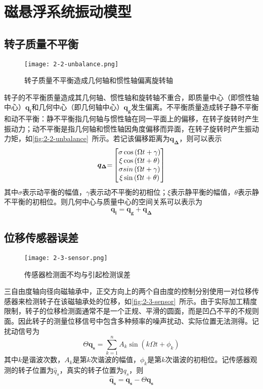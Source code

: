 \documentclass[
  lang=cn,
  degree=master,
  openany,oneside
]{nuaathesis}
\begin{document}
\section{磁悬浮系统振动模型}
\subsection{转子质量不平衡}
\begin{figure}[h!]
	\texttt{[image: 2-2-unbalance.png]}
	\caption{转子质量不平衡造成几何轴和惯性轴偏离旋转轴}
	\label{fig:2-2-unbalance}
\end{figure}

转子的不平衡质量造成其几何轴、惯性轴和旋转轴不重合，即质量中心（即惯性轴中心）$ \boldsymbol{q_i} $和几何中心（即几何轴中心）$ \boldsymbol{q_g} $发生偏离。不平衡质量造成转子静不平衡和动不平衡：静不平衡指几何轴与惯性轴在同一平面上的偏移，在转子旋转时产生振动力；动不平衡是指几何轴和惯性轴因角度偏移而异面，在转子旋转时产生振动力矩，如\autoref{fig:2-2-unbalance}~所示。若记该偏移距离为$ \boldsymbol{q_{\Delta}} $，则可以表示
\begin{equation}
\label{eq:q_delta}
\boldsymbol{{q}_\Delta }{ = }\left[ 
{\begin{matrix}
   {\sigma \cos \left( {\Omega t + \gamma } \right)}  \cr 
   {\xi \cos \left( {\Omega t + \theta } \right)}  \cr 
   {\sigma sin\left( {\Omega t + \gamma } \right)}  \cr 
   {\xi \sin \left( {\Omega t + \theta } \right)}  \cr 
\end{matrix}} 
 \right]
\end{equation}
其中$\sigma$表示动平衡的幅值，$\gamma$表示动不平衡的初相位；$\xi$表示静平衡的幅值，$\theta$表示静不平衡的初相位。则几何中心与质量中心的空间关系可以表示为
\begin{equation}
\boldsymbol{{q}_i}{ = }\boldsymbol{{q}_{g}} + \boldsymbol{{q}_\Delta }
\end{equation}

\subsection{位移传感器误差}

\begin{figure}[h!]
	\texttt{[image: 2-3-sensor.png]}
	\caption{传感器检测面不均与引起检测误差}
	\label{fig:2-3-sensor}
\end{figure}

三自由度轴向径向磁轴承中，正交方向上的两个自由度的控制分别使用一对位移传感器来检测转子在该磁轴承处的位移，如\autoref{fig:2-3-sensor}~所示。由于实际加工精度限制，转子的位移检测面通常不是一个正规、平滑的圆面，而是凹凸不平的不规则面。因此转子的测量位移信号中包含多种频率的噪声扰动、实际位置无法测得。记扰动信号为
\begin{equation}
\Theta \boldsymbol{{q}_s} = \sum\limits_{k = 1}^n {{A_k}\sin \left( {k\Omega t + {\phi _k}} \right)} 
\end{equation}
其中$k$是谐波次数，$A_k$是第$k$次谐波的幅值，$\phi _k$是第$k$次谐波的初相位。记传感器观测的转子位置为${\hat q}_s$，真实的转子位置为$q_s$，则
\begin{equation}
\boldsymbol{{\hat q}_s} = \boldsymbol{{q}_s} - \Theta \boldsymbol{{q}_s}
\end{equation}
\end{document}
